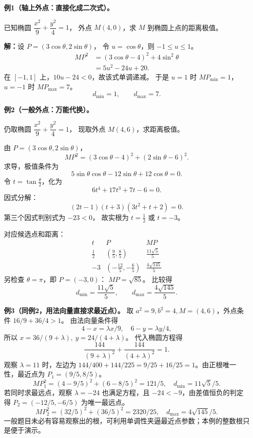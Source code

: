 \begin{examplebox}
\textbf{例1（轴上外点：直接化成二次式）。}

已知椭圆 $\dfrac{x^2}{9}+\dfrac{y^2}{4}=1$，
外点 $M(4,0)$，求 $M$ 到椭圆上点的距离极值。

\textbf{解：}设 $P=(3\cos\theta,2\sin\theta)$，
令 $u=\cos\theta$，则 $-1\le u\le1$。
\[
\begin{aligned}
MP^2&=(3\cos\theta-4)^2+4\sin^2\theta\\
    &=5u^2-24u+20.
\end{aligned}
\]
在 $[-1,1]$ 上，$10u-24<0$，故该式单调递减。
于是 $u=1$ 时 $MP_{\min}=1$，
$u=-1$ 时 $MP_{\max}=7$。
\[
\boxed{d_{\min}=1,\qquad d_{\max}=7.}
\]

\medskip
\textbf{例2（一般外点：万能代换）。}

仍取椭圆 $\dfrac{x^2}{9}+\dfrac{y^2}{4}=1$，
现取外点 $M(4,6)$，求距离极值。

由 $P=(3\cos\theta,2\sin\theta)$，
\[
MP^2=(3\cos\theta-4)^2+(2\sin\theta-6)^2.
\]
求导，极值条件为
\[
5\sin\theta\cos\theta
-12\sin\theta+12\cos\theta=0.
\]
令 $t=\tan\frac{\theta}{2}$，化为
\[
6t^4+17t^3+7t-6=0.
\]
因式分解：
\[
(2t-1)(t+3)(3t^2+t+2)=0.
\]
第三个因式判别式为 $-23<0$，
故实根为 $t=\frac12$ 或 $t=-3$。

对应候选点和距离：
\[
\begin{array}{c|c|c}
t & P & MP\\ \hline
\frac12 & (\frac95,\frac85) & \frac{11\sqrt5}{5}\\[3pt]
-3 & (-\frac{12}{5},-\frac65) & \frac{4\sqrt{145}}5
\end{array}
\]
另检查 $\theta=\pi$，即 $P=(-3,0)$：
$MP=\sqrt{85}$。
比较得
\[
\boxed{d_{\min}=\frac{11\sqrt5}{5},\qquad
       d_{\max}=\frac{4\sqrt{145}}5.}
\]

\medskip\textbf{例3（同例2，用法向量直接求最近点）。}
取 $a^2=9,b^2=4,M=(4,6)$，外点条件 $16/9+36/4>1$。
由法向量条件得
\[
4-x=\lambda x/9,\quad 6-y=\lambda y/4,
\]
所以 $x=36/(9+\lambda),\ y=24/(4+\lambda)$。
代入椭圆方程得
\[
\frac{144}{(9+\lambda)^2}+\frac{144}{(4+\lambda)^2}=1.
\]
观察 $\lambda=11$ 时，左边为 $144/400+144/225=9/25+16/25=1$。由正根唯一性，最近点为 $P_1=(9/5,8/5)$。
\[
MP_1^2=(4-9/5)^2+(6-8/5)^2=121/5,
\quad d_{\min}=11\sqrt5/5.
\]
若同时求最远点，观察 $\lambda=-24$ 也满足方程，且 $-24<-9$，由差值恒负的判定得 $P_2=(-12/5,-6/5)$ 为唯一最远点。
\[
MP_2^2=(32/5)^2+(36/5)^2=2320/25,
\quad d_{\max}=4\sqrt{145}/5.
\]
一般题目未必有容易观察出的根，可利用单调性夹逼最近点参数；本例的整数根只是便于演示。


\end{examplebox}
